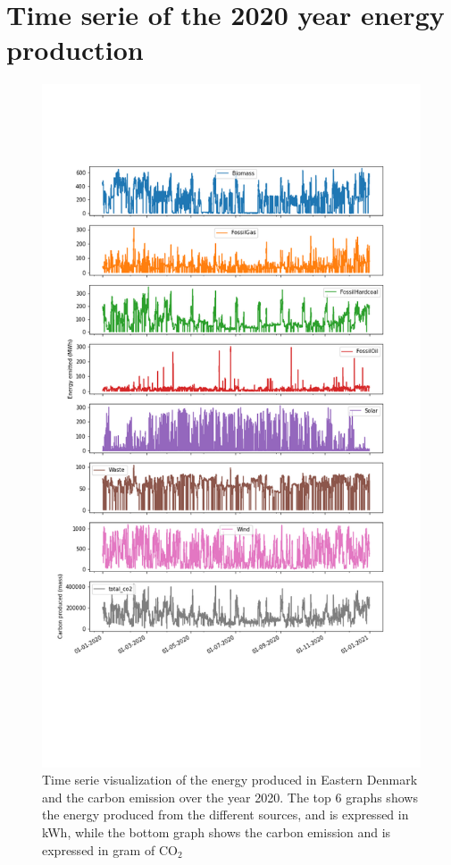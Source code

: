 \documentclass[11pt]{article} %
\begin{document}
\clearpage\newpage
\section{Time serie of the 2020 year energy production}\label{app:time_serie}
\begin{figure}[h!]
  \includegraphics[width=0.7\linewidth]{../outputs/energy_production_time_serie.png}
  \caption{Time serie visualization of the energy produced in Eastern Denmark and the carbon emission over the year 2020. The top 6 graphs shows the energy produced from the different sources, and is expressed in kWh, while the bottom graph shows the carbon emission and is expressed in gram of CO$_2$}
  \label{fig:time_series}
\end{figure}
\end{document}
